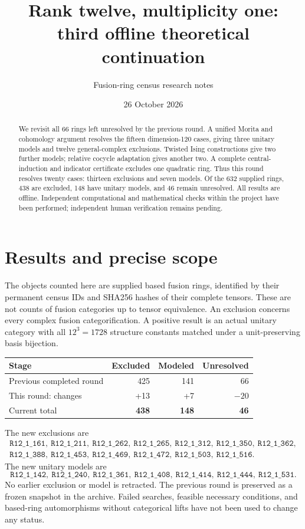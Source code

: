 \documentclass[11pt]{article}
\title{Rank twelve, multiplicity one:\\third offline theoretical continuation}
\author{Fusion-ring census research notes}
\date{26 October 2026}
\newcommand{\R}[1]{\texttt{R12\_1\_#1}}
\begin{document}
\maketitle
\begin{abstract}
We revisit all 66 rings left unresolved by the previous round. A unified
Morita and cohomology argument resolves the fifteen dimension-120 cases,
giving three unitary models and twelve general-complex exclusions.
Twisted Ising constructions give two further models; relative cocycle
adaptation gives another two. A complete central-induction and indicator
certificate excludes one quadratic ring. Thus this round resolves twenty
cases: thirteen exclusions and seven models. Of the 632 supplied rings,
438 are excluded, 148 have unitary models, and 46 remain unresolved.
All results are offline. Independent computational and mathematical checks
within the project have been performed; independent human verification
remains pending.
\end{abstract}

\section{Results and precise scope}
The objects counted here are supplied based fusion rings, identified by
their permanent census IDs and SHA256 hashes of their complete tensors.
These are not counts of fusion categories up to tensor equivalence.
An exclusion concerns every complex fusion categorification. A positive
result is an actual unitary category with all $12^3=1728$ structure
constants matched under a unit-preserving basis bijection.

\begin{center}
\begin{tabular}{lrrr}
\toprule
Stage & Excluded & Modeled & Unresolved\\
\midrule
Previous completed round &425&141&66\\
This round: changes &+13&+7&$-20$\\
Current total &\textbf{438}&\textbf{148}&\textbf{46}\\
\bottomrule
\end{tabular}
\end{center}

The new exclusions are
\[
\begin{gathered}
\R{161},\ \R{211},\ \R{262},\ \R{265},\ \R{312},\ \R{350},\ \R{362},\\
\R{388},\ \R{453},\ \R{469},\ \R{472},\ \R{503},\ \R{516}.
\end{gathered}
\]
The new unitary models are
\[
\R{142},\ \R{240},\ \R{361},\ \R{408},\ \R{414},\ \R{444},\ \R{531}.
\]
No earlier exclusion or model is retracted. The previous round is preserved
as a frozen snapshot in the archive. Failed searches, feasible necessary
conditions, and based-ring automorphisms without categorical lifts have
not been used to change any status.
\end{document}
